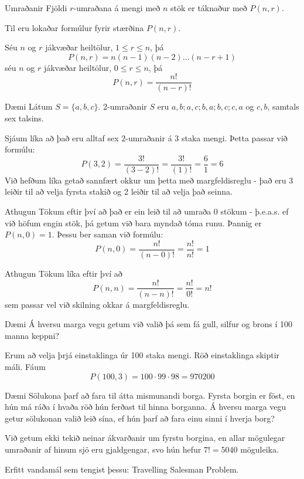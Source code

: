 \documentclass[handout]{beamer}
\begin{document}
\begin{frame}{Umraðanir}
Fjöldi $r$-umraðana á mengi með $n$ stök er táknaður með $P(n, r)$.

Til eru lokaðar formúlur fyrir stærðina $P(n,r)$. 

Séu $n$ og $r$ jákvæðar heiltölur, $1 \leq r \leq n$, þá
\[
 P (n, r) = n(n - 1)(n - 2) \ldots (n - r + 1)
\]
séu $n$ og $r$ jákvæðar heiltölur, $0 \leq r \leq n$, þá
\[
 P(n,r) = \frac{n!}{(n-r)!}
\]
\end{frame}

\begin{frame}{Dæmi}
Látum $S = \{a, b, c\}$. $2$-umraðanir $S$ eru $a, b; a, c; b, a;b, c; c, a$ og $c, b$, samtals sex talsins.

Sjáum líka að það eru alltaf sex $2$-umraðanir á 3 staka mengi. Þetta passar við formúlu:
\[
 P(3,2) = \frac{3!}{(3-2)!} = \frac{3!}{(1)!} = \frac{6}{1} = 6
\]
Við hefðum líka getað sannfært okkur um þetta með margfeldisreglu - það eru 3 leiðir til að velja fyrsta stakið og 2 leiðir til að velja það seinna.
\end{frame}

\begin{frame}{Athugun}
Tökum eftir því að það er ein leið til að umraða 0 stökum - þ.e.a.s. ef við höfum engin stök, þá getum við bara myndað tóma runu. Þannig er $P(n,0) = 1$. Þessu ber saman við formúlu:
\[
 P(n,0) = \frac{n!}{(n-0)!} = \frac{n!}{n!} = 1
\]
\end{frame}

\begin{frame}{Athugun}
Tökum líka eftir því að 
\[
 P(n,n) = \frac{n!}{(n-n)!} = \frac{n!}{0!} = n!
\]
sem passar vel við skilning okkar á margfeldisreglu.
\end{frame}

\begin{frame}{Dæmi}
Á hversu marga vegu getum við valið þá sem fá gull, silfur og brons í 100 manna keppni? \pause

Erum að velja þrjá einstaklinga úr 100 staka mengi. Röð einstaklinga skiptir máli. Fáum
\[
 P(100,3) = 100 \cdot 99 \cdot 98 = 970200
\]
\end{frame}

\begin{frame}{Dæmi}
Sölukona þarf að fara til átta mismunandi borga. Fyrsta borgin er föst, en hún má ráða í hvaða röð hún ferðast til hinna borganna. Á hversu marga vegu getur sölukonan valið leið sína, ef hún þarf að fara einu sinni í hverja borg? \pause

Við getum ekki tekið neinar ákvarðanir um fyrstu borgina, en allar mögulegar umraðanir af hinum sjö eru gjaldgengar, svo hún hefur $7! = 5040$ möguleika.

Erfitt vandamál sem tengist þessu: Travelling Salesman Problem.
\end{frame}
\end{document}
